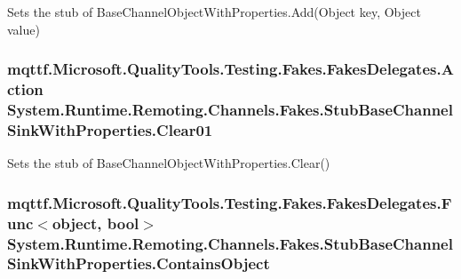Sets the stub of Base\-Channel\-Object\-With\-Properties.\-Add(\-Object key, Object value)

\hypertarget{class_system_1_1_runtime_1_1_remoting_1_1_channels_1_1_fakes_1_1_stub_base_channel_sink_with_properties_af9d9c67b9d93085f173fc84d7739c0ca}{
\subsubsection[{Clear01}]{\setlength{\rightskip}{0pt plus 5cm}mqttf.\-Microsoft.\-Quality\-Tools.\-Testing.\-Fakes.\-Fakes\-Delegates.\-Action System.\-Runtime.\-Remoting.\-Channels.\-Fakes.\-Stub\-Base\-Channel\-Sink\-With\-Properties.\-Clear01}}\label{class_system_1_1_runtime_1_1_remoting_1_1_channels_1_1_fakes_1_1_stub_base_channel_sink_with_properties_af9d9c67b9d93085f173fc84d7739c0ca}


Sets the stub of Base\-Channel\-Object\-With\-Properties.\-Clear()

\hypertarget{class_system_1_1_runtime_1_1_remoting_1_1_channels_1_1_fakes_1_1_stub_base_channel_sink_with_properties_a49b20ae3bd09cc9f6a4aaf437af0c8bb}{
\subsubsection[{Contains\-Object}]{\setlength{\rightskip}{0pt plus 5cm}mqttf.\-Microsoft.\-Quality\-Tools.\-Testing.\-Fakes.\-Fakes\-Delegates.\-Func$<$object, bool$>$ System.\-Runtime.\-Remoting.\-Channels.\-Fakes.\-Stub\-Base\-Channel\-Sink\-With\-Properties.\-Contains\-Object}}\label{class_system_1_1_runtime_1_1_remoting_1_1_channels_1_1_fakes_1_1_stub_base_channel_sink_with_properties_a49b20ae3bd09cc9f6a4aaf437af0c8bb}


